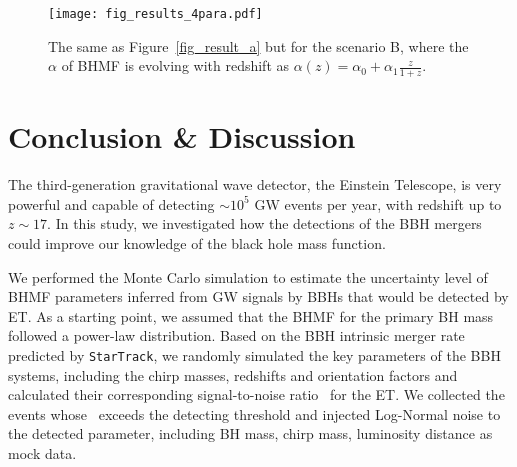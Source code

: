 \documentclass[twocolumn]{aastex62}
\newcommand{\kai}[1]{\textcolor{red}{[{\bf Kai}: #1]}}
\begin{document}
\begin{figure}%
\texttt{[image: fig\_results\_4para.pdf]}
\caption{
The same as Figure~\ref{fig_result_a} but for the scenario B, where the $\alpha$ of BHMF is evolving with redshift as $\alpha(z) = \alpha_0 + \alpha_1\frac{z}{1+z}$. 
}
\label{fig_result_b}
\end{figure}

\vspace{1cm}
\section{Conclusion \& Discussion} \label{sec_summary}
The third-generation gravitational wave detector, the Einstein Telescope, is very powerful and capable of detecting $\sim10^5$ GW events per year, with redshift up to $z\sim17$. In this study, we investigated how the detections of the BBH mergers could improve our knowledge of the black hole mass function.

We performed the Monte Carlo simulation to estimate the uncertainty level of BHMF parameters inferred from GW signals by BBHs that would be detected by ET. As a starting point, we assumed that the BHMF for the primary BH mass followed a power-law distribution. Based on the BBH intrinsic merger rate predicted by {\tt StarTrack}, we randomly simulated the key parameters of the BBH systems, including the chirp masses, redshifts and orientation factors and calculated  their corresponding signal-to-noise ratio \snr\ for the ET. We collected the events whose \snr\ exceeds the detecting threshold and injected Log-Normal noise to the detected parameter, including BH mass, chirp mass, luminosity distance as mock data.
\end{document}
